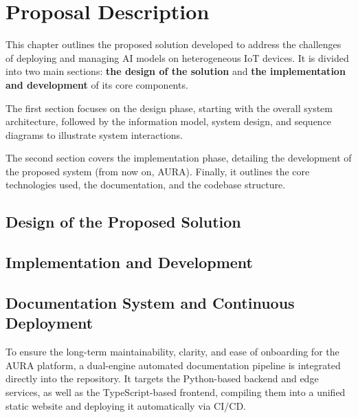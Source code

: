 \chapter{Proposal Description}\label{ch:proposal}

This chapter outlines the proposed solution developed to address the challenges of deploying and managing \gls{AI} models on heterogeneous \gls{IoT} devices. It is divided into two main sections: \textbf{the design of the solution} and \textbf{the implementation and development} of its core components.

The first section focuses on the design phase, starting with the overall system architecture, followed by the information model, system design, and sequence diagrams to illustrate system interactions. 

The second section covers the implementation phase, detailing the development of the proposed system (from now on, \gls{AURA}). Finally, it outlines the core technologies used, the documentation, and the codebase structure.

\section{Design of the Proposed Solution}\label{sec:proposal:design}



\clearpage

\section{Implementation and Development}\label{sec:proposal:implementation}



\clearpage

\section{Documentation System and Continuous Deployment}\label{sec:impl:documentation}

To ensure the long-term maintainability, clarity, and ease of onboarding for the \gls{AURA} platform, a dual-engine automated documentation pipeline is integrated directly into the repository. It targets the Python-based backend and edge services, as well as the TypeScript-based frontend, compiling them into a unified static website and deploying it automatically via \gls{CI/CD}.

